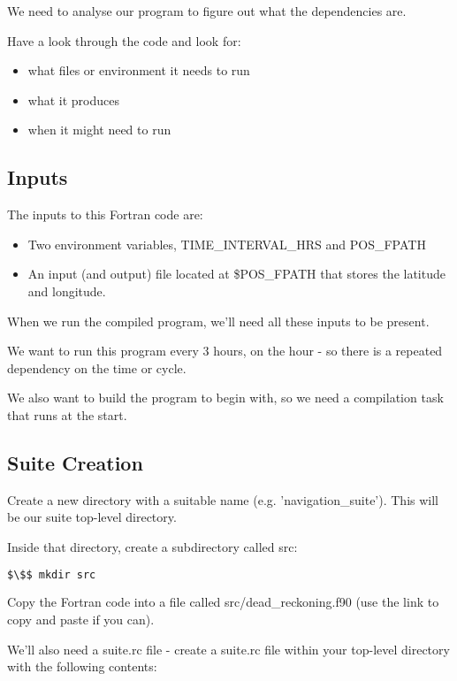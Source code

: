 We need to analyse our program to figure out what the dependencies are.

Have a look through the code and look for:
\begin{itemize}
    \item what files or environment it needs to run
    \item what it produces
    \item when it might need to run
\end{itemize}

\subsection{Inputs}

The inputs to this Fortran code are:
\begin{itemize}
    \item Two environment variables, TIME\_INTERVAL\_HRS and POS\_FPATH
    \item An input (and output) file located at \$POS\_FPATH that stores the latitude and longitude.
\end{itemize}

When we run the compiled program, we'll need all these inputs to be present.

We want to run this program every 3 hours, on the hour - so there is a repeated dependency on the time or cycle.

We also want to build the program to begin with, so we need a compilation task that runs at the start.

\subsection{Suite Creation}

Create a new directory with a suitable name (e.g. 'navigation\_suite'). This will be our suite top-level directory.

Inside that directory, create a subdirectory called src:

\begin{lstlisting}[mathescape, language=bash]
$\$$ mkdir src
\end{lstlisting}


Copy the Fortran code into a file called src/dead\_reckoning.f90 (use the link to copy and paste if you can).

We'll also need a suite.rc file - create a suite.rc file within your top-level directory with the following contents:

